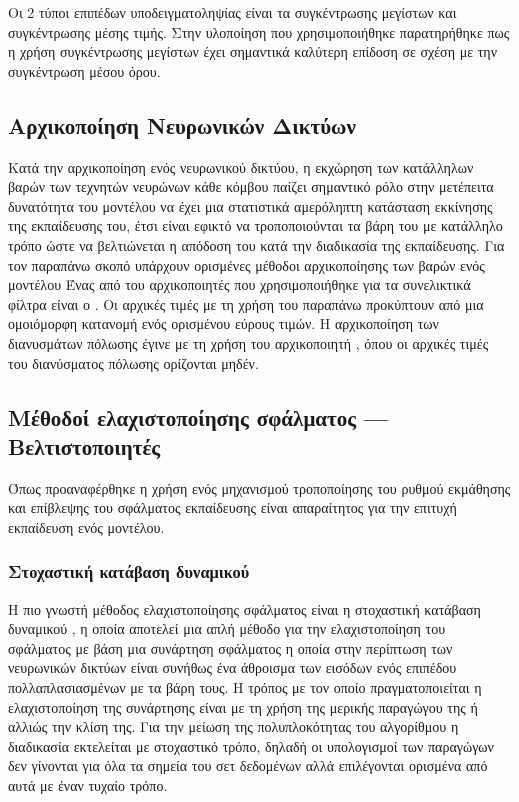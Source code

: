 Οι 2 τύποι επιπέδων υποδειγματοληψίας είναι τα συγκέντρωσης μεγίστων και συγκέντρωσης μέσης τιμής. Στην υλοποίηση που χρησιμοποιήθηκε παρατηρήθηκε πως η χρήση συγκέντρωσης μεγίστων έχει σημαντικά καλύτερη επίδοση σε σχέση με την συγκέντρωση μέσου όρου.

\subsection{Αρχικοποίηση Νευρωνικών Δικτύων}
Κατά την αρχικοποίηση ενός νευρωνικού δικτύου, η εκχώρηση των κατάλληλων βαρών των τεχνητών νευρώνων κάθε κόμβου παίζει σημαντικό ρόλο στην μετέπειτα δυνατότητα του μοντέλου να έχει μια στατιστικά αμερόληπτη κατάσταση εκκίνησης της εκπαίδευσης του, έτσι είναι εφικτό να τροποποιούνται τα βάρη του με κατάλληλο τρόπο ώστε να βελτιώνεται η απόδοση του κατά την διαδικασία της εκπαίδευσης.
Για τον παραπάνω σκοπό υπάρχουν ορισμένες μέθοδοι αρχικοποίησης των βαρών ενός μοντέλου
Ένας από του αρχικοποιητές που χρησιμοποιήθηκε για τα συνελικτικά φίλτρα είναι ο . Οι αρχικές τιμές με τη χρήση του παραπάνω προκύπτουν από μια ομοιόμορφη κατανομή ενός ορισμένου εύρους τιμών. Η αρχικοποίηση των διανυσμάτων πόλωσης έγινε με τη χρήση του αρχικοποιητή
 , όπου οι αρχικές τιμές του διανύσματος πόλωσης ορίζονται μηδέν.

\subsection{Μέθοδοί ελαχιστοποίησης σφάλματος --- Βελτιστοποιητές }
Όπως προαναφέρθηκε η χρήση ενός μηχανισμού τροποποίησης του ρυθμού εκμάθησης και επίβλεψης του σφάλματος εκπαίδευσης είναι απαραίτητος για την επιτυχή εκπαίδευση ενός μοντέλου. 

\subsubsection{Στοχαστική κατάβαση δυναμικού }
Η πιο γνωστή μέθοδος ελαχιστοποίησης σφάλματος είναι η στοχαστική κατάβαση δυναμικού , η οποία αποτελεί μια απλή μέθοδο για την ελαχιστοποίηση του σφάλματος με βάση μια συνάρτηση σφάλματος η οποία στην περίπτωση των νευρωνικών δικτύων είναι συνήθως ένα άθροισμα των εισόδων ενός επιπέδου πολλαπλασιασμένων με τα βάρη τους. Η τρόπος με τον οποίο πραγματοποιείται η ελαχιστοποίηση της συνάρτησης είναι με τη χρήση της μερικής παραγώγου της ή αλλιώς την κλίση της. Για την μείωση της πολυπλοκότητας του αλγορίθμου η διαδικασία εκτελείται με στοχαστικό τρόπο, δηλαδή οι υπολογισμοί των παραγώγων δεν γίνονται για όλα τα σημεία του σετ δεδομένων αλλά επιλέγονται ορισμένα από αυτά με έναν τυχαίο τρόπο.

